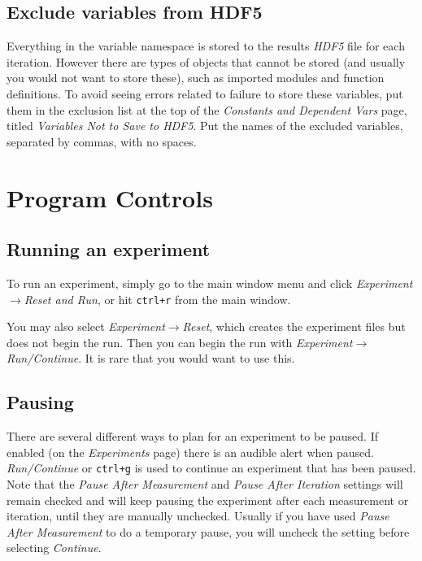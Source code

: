 \documentclass[pdftex,11pt,letterpaper]{article}
\begin{document}
\subsection{Exclude variables from HDF5}

Everything in the variable namespace is stored to the results \textit{HDF5} file for each iteration.  However there are types of objects that cannot be stored (and usually you would not want to store these), such as imported modules and function definitions.  To avoid seeing errors related to failure to store these variables, put them in the exclusion list at the top of the \textit{Constants and Dependent Vars} page, titled \textit{Variables Not to Save to HDF5}.  Put the names of the excluded variables, separated by commas, with no spaces.

\section{Program Controls}

\subsection{Running an experiment}

To run an experiment, simply go to the main window menu and click \textit{Experiment}$\rightarrow$\textit{Reset and Run}, or hit \texttt{ctrl+r} from the main window.

You may also select \textit{Experiment}$\rightarrow$\textit{Reset}, which creates the experiment files but does not begin the run.  Then you can begin the run with \textit{Experiment}$\rightarrow$\textit{Run/Continue}. It is rare that you would want to use this.

\subsection{Pausing}

There are several different ways to plan for an experiment to be paused.  If enabled (on the \textit{Experiments} page) there is an audible alert when paused.  \textit{Run/Continue} or \texttt{ctrl+g} is used to continue an experiment that has been paused.  Note that the \textit{Pause After Measurement} and \textit{Pause After Iteration} settings will remain checked and will keep pausing the experiment after each measurement or iteration, until they are manually unchecked.  Usually if you have used \textit{Pause After Measurement} to do a temporary pause, you will uncheck the setting before selecting \textit{Continue}.
\end{document}
